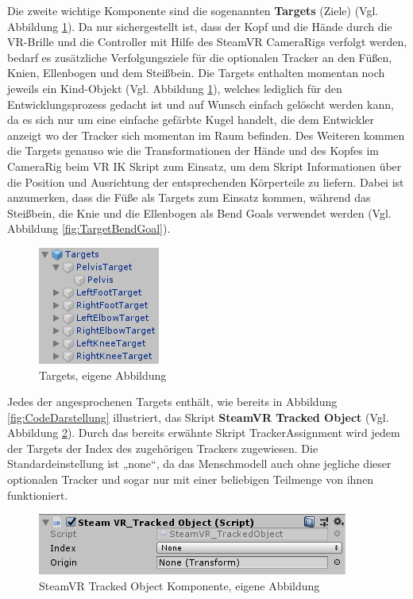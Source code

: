 \newline
Die zweite wichtige Komponente sind die sogenannten \textbf{Targets} (Ziele) (Vgl. Abbildung \ref{fig:Targets}). Da nur sichergestellt ist, dass der Kopf und die Hände durch die VR-Brille und die Controller mit Hilfe des SteamVR CameraRigs verfolgt werden, bedarf es zusätzliche Verfolgungsziele für die optionalen Tracker an den Füßen, Knien, Ellenbogen und dem Steißbein. Die Targets enthalten momentan noch jeweils ein Kind-Objekt (Vgl. Abbildung \ref{fig:Targets}), welches lediglich für den Entwicklungsprozess gedacht ist und auf Wunsch einfach gelöscht werden kann, da es sich nur um eine einfache gefärbte Kugel handelt, die dem Entwickler anzeigt wo der Tracker sich momentan im Raum befinden. Des Weiteren kommen die Targets genauso wie die Transformationen der Hände und des Kopfes im CameraRig beim VR IK Skript zum Einsatz, um dem Skript Informationen über die Position und Ausrichtung der entsprechenden Körperteile zu liefern. Dabei ist anzumerken, dass die Füße als Targets zum Einsatz kommen, während das Steißbein, die Knie und die Ellenbogen als Bend Goals verwendet werden (Vgl. Abbildung \ref{fig:TargetBendGoal}).
\begin{figure}[h]
	\centering
	\includegraphics[width=0.25\linewidth]{Bilder/A38_Targets}
	\caption{Targets, eigene Abbildung}
	\label{fig:Targets}
\end{figure}
\newline
Jedes der angesprochenen Targets enthält, wie bereits in Abbildung \ref{fig:CodeDarstellung} illustriert, das Skript \textbf{SteamVR Tracked Object} (Vgl. Abbildung \ref{fig:TrackedObject}). Durch das bereits erwähnte Skript TrackerAssignment wird jedem der Targets der Index des zugehörigen Trackers zugewiesen. Die Standardeinstellung ist „none“, da das Menschmodell auch ohne jegliche dieser optionalen Tracker und sogar nur mit einer beliebigen Teilmenge von ihnen funktioniert.
\begin{figure}[h]
	\centering
	\includegraphics[width=0.45\linewidth]{Bilder/A39_SteamVRTrackedObject}
	\caption{SteamVR Tracked Object Komponente, eigene Abbildung}
	\label{fig:TrackedObject}
\end{figure}


